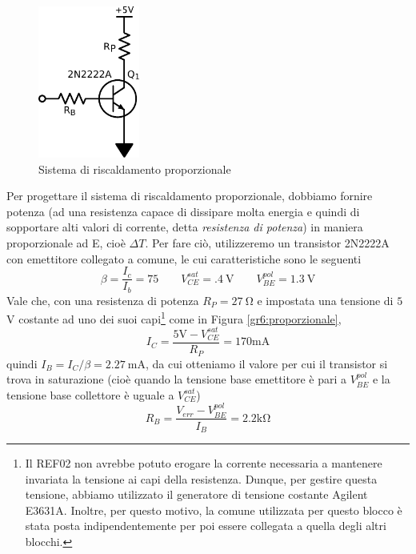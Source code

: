 \begin{figure}
\centering
\includegraphics[height=5cm]{../E06/latex/P5.pdf}
\caption{Sistema di riscaldamento proporzionale}
\label{fig6:sistema}
\end{figure}

Per progettare il sistema di riscaldamento proporzionale, dobbiamo fornire potenza (ad una resistenza capace di dissipare molta energia e quindi di sopportare alti valori di corrente, detta \textit{resistenza di potenza}) in maniera proporzionale ad E, cioè $\Delta T$.
Per fare ciò, utilizzeremo un transistor 2N2222A con emettitore collegato a comune, le cui caratteristiche sono le seguenti
$$\beta=\frac{I_c}{I_b}=75 \qquad V_{CE}^{sat}=\SI{.4}{\volt} \qquad V_{BE}^{pol}=\SI{1.3}{\volt}$$
Vale che, con una resistenza di potenza $R_{P} = \SI{27}{\ohm}$ e impostata una tensione di $5$ \si{\volt} costante ad uno dei suoi capi\footnote{Il REF02 non avrebbe potuto erogare la corrente necessaria a mantenere invariata la tensione ai capi della resistenza.
Dunque, per gestire questa tensione, abbiamo utilizzato il generatore di tensione costante Agilent E3631A.
Inoltre, per questo motivo, la comune utilizzata per questo blocco è stata posta indipendentemente per poi essere collegata a quella degli altri blocchi.} come in Figura \ref{gr6:proporzionale},
$$I_{C}=\frac{5 \si{\volt}- V_{CE}^{sat}}{R_P}=170 \si{\milli\ampere}$$
quindi $I_B=I_{C}/\beta=\SI{2.27}{\mA}$, da cui otteniamo il valore per cui il transistor si trova in saturazione (cioè quando la tensione base emettitore è pari a $V_{BE}^{pol}$ e la tensione base collettore è uguale a $V_{CE}^{sat}$)
$$R_B=\frac{V_{err} - V_{BE}^{pol}}{I_B}=2.2 \si{\kilo\ohm}$$

